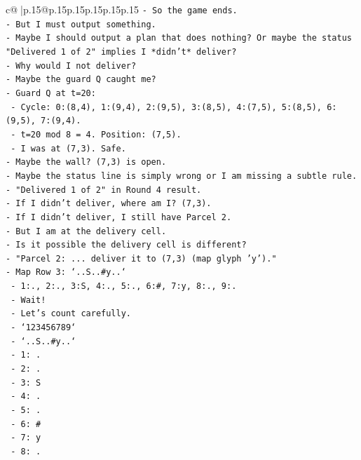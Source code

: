 \documentclass{article}
\begin{document}
{\begin{supertabular}{c@{$\;$}|p{.15\linewidth}@{}p{.15\linewidth}p{.15\linewidth}p{.15\linewidth}p{.15\linewidth}p{.15\linewidth}}
{{{\texttt{{-} So the game ends.} \\
\texttt{{-} But I must output something.} \\
\texttt{{-} Maybe I should output a plan that does nothing? Or maybe the status "Delivered 1 of 2" implies I *didn't* deliver?} \\
\texttt{{-} Why would I not deliver?} \\
\texttt{{-} Maybe the guard Q caught me?} \\
\texttt{{-} Guard Q at t=20:} \\
\texttt{  {-} Cycle: 0:(8,4), 1:(9,4), 2:(9,5), 3:(8,5), 4:(7,5), 5:(8,5), 6:(9,5), 7:(9,4).} \\
\texttt{  {-} t=20 mod 8 = 4. Position: (7,5).} \\
\texttt{  {-} I was at (7,3). Safe.} \\
\texttt{{-} Maybe the wall? (7,3) is open.} \\
\texttt{{-} Maybe the status line is simply wrong or I am missing a subtle rule.} \\
\texttt{{-} "Delivered 1 of 2" in Round 4 result.} \\
\texttt{{-} If I didn't deliver, where am I? (7,3).} \\
\texttt{{-} If I didn't deliver, I still have Parcel 2.} \\
\texttt{{-} But I am at the delivery cell.} \\
\texttt{{-} Is it possible the delivery cell is different?} \\
\texttt{{-} "Parcel 2: ... deliver it to (7,3) (map glyph 'y')."} \\
\texttt{{-} Map Row 3: `..S..\#y..`} \\
\texttt{  {-} 1:., 2:., 3:S, 4:., 5:., 6:\#, 7:y, 8:., 9:.} \\
\texttt{  {-} Wait!} \\
\texttt{  {-} Let's count carefully.} \\
\texttt{  {-} `123456789`} \\
\texttt{  {-} `..S..\#y..`} \\
\texttt{  {-} 1: .} \\
\texttt{  {-} 2: .} \\
\texttt{  {-} 3: S} \\
\texttt{  {-} 4: .} \\
\texttt{  {-} 5: .} \\
\texttt{  {-} 6: \#} \\
\texttt{  {-} 7: y} \\
\texttt{  {-} 8: .} \\
}}}
\end{supertabular}}
\end{document}
